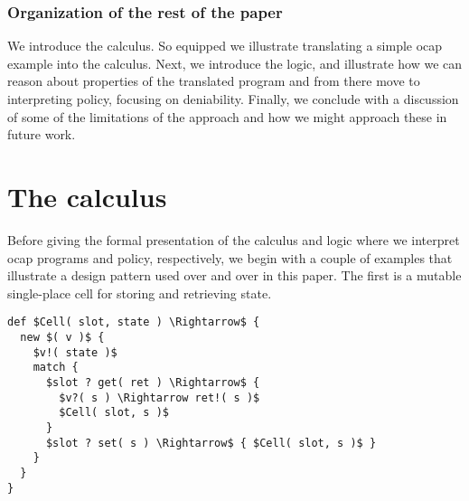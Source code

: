 \documentclass[]{acm_proc_article-sp}
\numberwithin{equation}{subsection}
\begin{document}
\subsubsection{Organization of the rest of the paper}

We introduce the calculus. So equipped we illustrate translating a
simple ocap example into the calculus. Next, we introduce the logic,
and illustrate how we can reason about properties of the translated
program and from there move to interpreting policy, focusing on
deniability. Finally, we conclude with a discussion of some of the
limitations of the approach and how we might approach these in future
work.


\section{The calculus}

Before giving the formal presentation of the calculus and logic where
we interpret ocap programs and policy, respectively, we begin with a
couple of examples that illustrate a design pattern used over and over
in this paper. The first is a mutable single-place cell for storing
and retrieving state.




\begin{lstlisting}[mathescape]
def $Cell( slot, state ) \Rightarrow$ {
  new $( v )$ {
    $v!( state )$
    match {
      $slot ? get( ret ) \Rightarrow$ {
        $v?( s ) \Rightarrow ret!( s )$
        $Cell( slot, s )$
      }
      $slot ? set( s ) \Rightarrow$ { $Cell( slot, s )$ }
    }
  }
}
\end{lstlisting}

\end{document}
